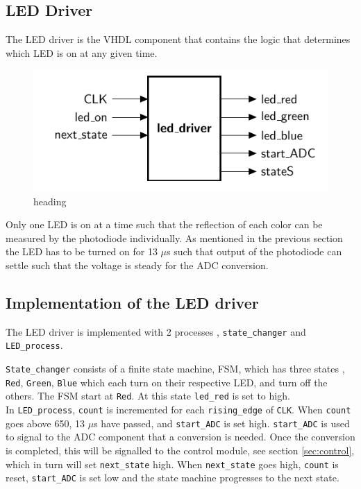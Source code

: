 \subsection{LED Driver}
The LED driver is the VHDL component that contains the logic that determines which LED is on at any given time.
\begin{figure}[h!]
	\centering
	\includegraphics[scale=1]{images/LED_ent}
	\caption{heading}
	\label{fig:pinoutled}
\end{figure}
Only one LED is on at a time such that the reflection of each color can be measured by the photodiode individually.
As mentioned in the previous section the LED has to be turned on for 13 $\mu$s such that output of the photodiode can settle such that the voltage is steady for the ADC conversion.
\subsection{Implementation of the LED driver}

The LED driver is implemented with 2 processes , \texttt{state\_changer} and \texttt{LED\_process}. 

\texttt{State\_changer} consists of a finite state machine, FSM, which has three states , \texttt{Red}, \texttt{Green}, \texttt{Blue} which each turn on their respective LED, and turn off the others.  The FSM start at \texttt{Red}.  At this state \texttt{led\_red} is set to high.\\

In \texttt{LED\_process}, \texttt{count} is incremented for each \texttt{rising\_edge} of \texttt{CLK}.  When \texttt{count} goes above 650, 13 $\mu$s have passed, and  \texttt{start\_ADC} is set high. 
\texttt{start\_ADC} is used to signal to the ADC component that a conversion is needed.
Once the conversion is completed, this will be signalled to the control module, see section \ref{sec:control}, which in turn will set \texttt{next\_state} high.
When \texttt{next\_state} goes high, \texttt{count} is reset, \texttt{start\_ADC} is set low  and the state machine progresses to the next state.
